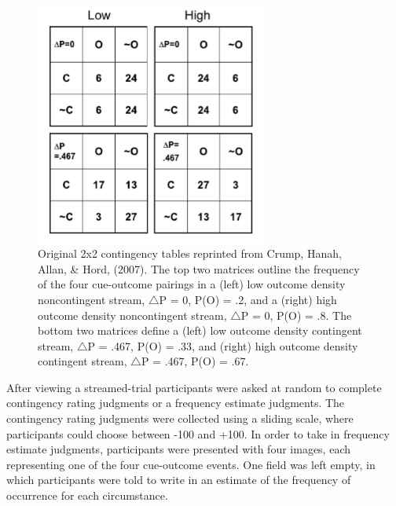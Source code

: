 \documentclass[
  english,
  man,floatsintext]{apa6}
\begin{document}
\begin{figure}

{\centering \includegraphics[width=3in]{imgs/crump_figure2_cropped} 

}

\caption{Original 2x2 contingency tables reprinted from Crump, Hanah, Allan, \& Hord, (2007). The top two matrices outline the frequency of the four cue-outcome pairings in a (left) low outcome density noncontingent stream, $\triangle$P = 0, P(O) = .2, and a (right) high outcome density noncontingent stream, $\triangle$P = 0, P(O) = .8. The bottom two matrices define a (left) low outcome density contingent stream, $\triangle$P = .467, P(O) = .33, and (right) high outcome density contingent stream,  $\triangle$P = .467, P(O) = .67.}\label{fig:unnamed-chunk-1}
\end{figure}

After viewing a streamed-trial participants were asked at random to complete contingency rating judgments or a frequency estimate judgments. The contingency rating judgments were collected using a sliding scale, where participants could choose between -100 and +100. In order to take in frequency estimate judgments, participants were presented with four images, each representing one of the four cue-outcome events. One field was left empty, in which participants were told to write in an estimate of the frequency of occurrence for each circumstance.
\end{document}

